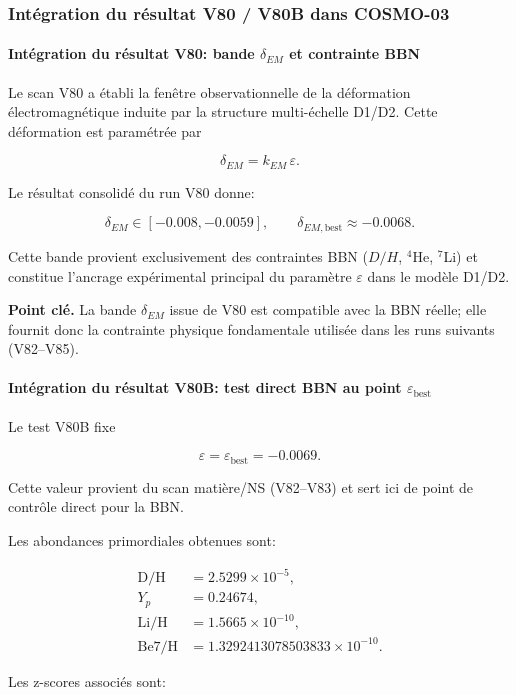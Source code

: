 \documentclass[11pt,a4paper]{article}
\begin{document}
\subsubsection{Intégration du résultat V80 / V80B dans COSMO-03}
\label{subsubsec:v80-v80b-cosmo03}

\paragraph{Intégration du résultat V80: bande $\delta_{EM}$ et contrainte BBN}
Le scan V80 a établi la fenêtre observationnelle de la déformation électromagnétique
induite par la structure multi-échelle D1/D2. Cette déformation est paramétrée par

\[
\delta_{EM}=k_{EM}\,\varepsilon.
\]

Le résultat consolidé du run V80 donne:

\[
\delta_{EM}\in[-0.008,-0.0059],
\qquad
\delta_{EM,\mathrm{best}}\approx -0.0068.
\]

Cette bande provient exclusivement des contraintes BBN ($D/H$, $^4$He, $^7$Li) et constitue
l'ancrage expérimental principal du paramètre $\varepsilon$ dans le modèle D1/D2.

\noindent\textbf{Point clé.}
La bande $\delta_{EM}$ issue de V80 est compatible avec la BBN réelle;
elle fournit donc la contrainte physique fondamentale utilisée dans les runs suivants (V82--V85).

\paragraph{Intégration du résultat V80B: test direct BBN au point $\varepsilon_{\mathrm{best}}$}
Le test V80B fixe

\[
\varepsilon=\varepsilon_{\mathrm{best}}=-0.0069.
\]

Cette valeur provient du scan matière/NS (V82--V83) et sert ici de point de contrôle
direct pour la BBN.

Les abondances primordiales obtenues sont:

\[
\begin{aligned}
\mathrm{D/H} &= 2.5299\times 10^{-5},\\
Y_p &= 0.24674,\\
\mathrm{Li/H} &= 1.5665\times 10^{-10},\\
\mathrm{Be7/H} &= 1.3292413078503833\times 10^{-10}.
\end{aligned}
\]

Les z-scores associés sont:
\end{document}
